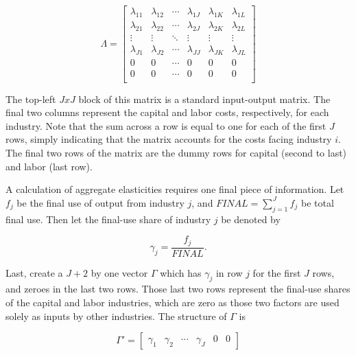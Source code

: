 \documentclass[11pt]{article}
\begin{document}
\begin{equation}
	\Lambda = 
	\begin{bmatrix}
		\lambda_{11} & \lambda_{12} & \cdots & \lambda_{1J} & \lambda_{1K} & \lambda_{1L} \\
		\lambda_{21} & \lambda_{22} & \cdots & \lambda_{2J} & \lambda_{2K} & \lambda_{2L} \\
		\vdots       & \vdots       & \ddots & \vdots       & \vdots       & \vdots  \\
		\lambda_{J1} & \lambda_{J2} & \cdots & \lambda_{JJ} & \lambda_{JK} & \lambda_{JL} \\
		0 & 0 & \cdots & 0 & 0& 0 \\
		0 & 0 & \cdots & 0 & 0& 0 \\
	\end{bmatrix} \label{EQ_Lambda}
\end{equation} 

The top-left $JxJ$ block of this matrix is a standard input-output matrix. The final two columns represent the capital and labor costs, respectively, for each industry. Note that the sum across a row is equal to one for each of the first $J$ rows, simply indicating that the matrix accounts for the costs facing industry $i$. The final two rows of the matrix are the dummy rows for capital (second to last) and labor (last row).

A calculation of aggregate elasticities requires one final piece of information. Let $f_j$ be the final use of output from industry $j$, and $FINAL = \sum_{j=1}^J f_j$ be total final use. Then let the final-use share of industry $j$ be denoted by

\begin{equation}
	\gamma_j = \frac{f_j}{FINAL}.
\end{equation}

Last, create a $J+2$ by one vector $\Gamma$ which has $\gamma_j$ in row $j$ for the first $J$ rows, and zeroes in the last two rows. Those last two rows represent the final-use shares of the capital and labor industries, which are zero as those two factors are used solely as inputs by other industries. The structure of $\Gamma$ is

\begin{equation}
	\Gamma' = 
	\begin{bmatrix}
		\gamma_1 &
		\gamma_2 &
		\cdots &
		\gamma_J &
		0 &
		0
	\end{bmatrix} \label{EQ_Gamma}
\end{equation}
\end{document}
